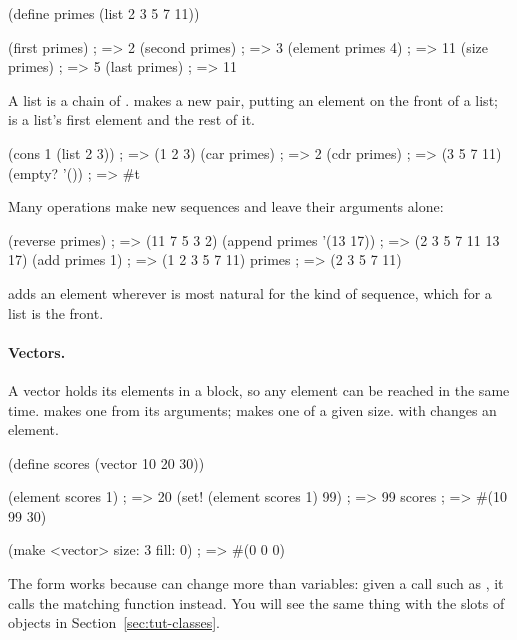 \begin{dylan}
(define primes (list 2 3 5 7 11))

(first primes)                  ; => 2
(second primes)                 ; => 3
(element primes 4)              ; => 11
(size primes)                   ; => 5
(last primes)                   ; => 11
\end{dylan}

A list is a chain of .  makes a new pair, putting
an element on the front of a list;  is a list's first element
and  the rest of it.

\begin{dylan}
(cons 1 (list 2 3))             ; => (1 2 3)
(car primes)                    ; => 2
(cdr primes)                    ; => (3 5 7 11)
(empty? '())                    ; => #t
\end{dylan}

Many operations make new sequences and leave their arguments alone:

\begin{dylan}
(reverse primes)                ; => (11 7 5 3 2)
(append primes '(13 17))        ; => (2 3 5 7 11 13 17)
(add primes 1)                  ; => (1 2 3 5 7 11)
primes                          ; => (2 3 5 7 11)
\end{dylan}

 adds an element wherever is most natural for the kind of
sequence, which for a list is the front.

\paragraph{Vectors.}
A vector holds its elements in a block, so any element can be reached in
the same time.  makes one from its arguments; 
makes one of a given size.  with  changes an
element.

\begin{dylan}
(define scores (vector 10 20 30))

(element scores 1)              ; => 20
(set! (element scores 1) 99)    ; => 99
scores                          ; => #(10 99 30)

(make <vector> size: 3 fill: 0) ; => #(0 0 0)
\end{dylan}

The form  works because  can
change more than variables: given a call such as , it calls the matching  function instead. You will see
the same thing with the slots of objects in Section~\ref{sec:tut-classes}.

